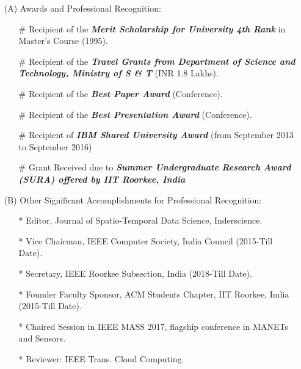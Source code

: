 \begin{itemize}
\item[(A)]  Awards and Professional Recognition:

\begin{itemize}
	\item[\#]
	Recipient of the \emph{\textbf{Merit Scholarship for University 4th Rank}}
	in Master's Course (1995).
	
	\item[\#]
	Recipient of the \emph{\textbf{Travel Grants from Department of Science and Technology, Ministry of S \& T}}
	(INR 1.8 Lakhs).
	
	\item[\#]
	Recipient of the \emph{\textbf{Best Paper Award}} (Conference).
	
	\item[\#]
	Recipient of the \emph{\textbf{Best Presentation Award}} (Conference).

	\item[\#]
	Recipient of \textbf{\textit{IBM Shared University Award}} (from September 2013 to September 2016)
	
	\item[\#]
	Grant Received due to \textbf{\textit{Summer Undergraduate Research Award (SURA) offered by IIT Roorkee, India}}  
	
\end{itemize}

\item[(B)] Other Significant Accomplishments for Professional Recognition: 

\begin{itemize}
	\item[*] Editor, Journal of Spatio-Temporal Data Science, Inderscience.

	\item[*] Vice Chairman, IEEE Computer Society, India Council (2015-Till Date).

	\item[*] Secretary, IEEE Roorkee Subsection, India (2018-Till Date).

	\item[*] Founder Faculty Sponsor, ACM Students Chapter, IIT Roorkee, India (2015-Till Date).
	
	\item[*] Chaired Session in IEEE MASS 2017, flagship conference in MANETs and Sensors.
		
	\item[*] Reviewer: IEEE Trans. Cloud Computing.
	

\end{itemize}
\end{itemize}
